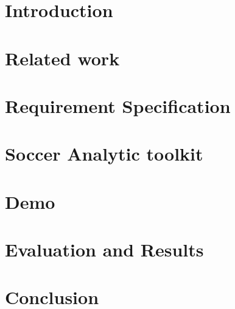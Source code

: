 \documentclass[12pt,twoside,a4paper,openright]{book}
\begin{document}
\listoffigures

\listoftables

\pagestyle{plain}
\cleardoublepage
{}
\chapter{Introduction} \label{Introduction}

\acresetall
\chapter{Related work} \label{Background}

\acresetall
\chapter{Requirement Specification} \label{Requirements}

\acresetall

\chapter{Soccer Analytic toolkit} \label{Design}

\acresetall

\chapter{Demo} \label{Model}

\acresetall

\chapter{Evaluation and Results} \label{Evaluation}
 
\acresetall

\chapter{Conclusion} \label{Conclusion}

\acresetall




\appendix
\end{document}
